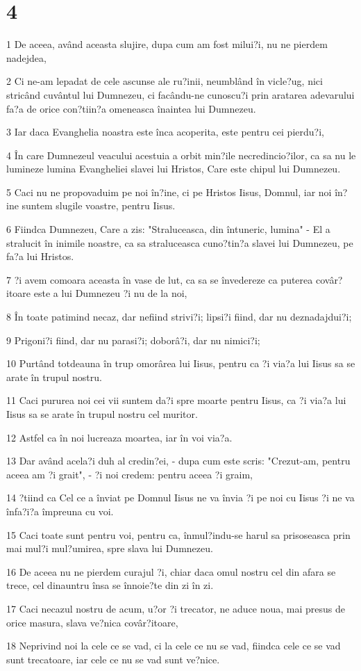 \chapter{4}

\par 1 De aceea, având aceasta slujire, dupa cum am fost milui?i, nu ne pierdem nadejdea,
\par 2 Ci ne-am lepadat de cele ascunse ale ru?inii, neumblând în vicle?ug, nici stricând cuvântul lui Dumnezeu, ci facându-ne cunoscu?i prin aratarea adevarului fa?a de orice con?tiin?a omeneasca înaintea lui Dumnezeu.
\par 3 Iar daca Evanghelia noastra este înca acoperita, este pentru cei pierdu?i,
\par 4 În care Dumnezeul veacului acestuia a orbit min?ile necredincio?ilor, ca sa nu le lumineze lumina Evangheliei slavei lui Hristos, Care este chipul lui Dumnezeu.
\par 5 Caci nu ne propovaduim pe noi în?ine, ci pe Hristos Iisus, Domnul, iar noi în?ine suntem slugile voastre, pentru Iisus.
\par 6 Fiindca Dumnezeu, Care a zis: "Straluceasca, din întuneric, lumina" - El a stralucit în inimile noastre, ca sa straluceasca cuno?tin?a slavei lui Dumnezeu, pe fa?a lui Hristos.
\par 7 ?i avem comoara aceasta în vase de lut, ca sa se învedereze ca puterea covâr?itoare este a lui Dumnezeu ?i nu de la noi,
\par 8 În toate patimind necaz, dar nefiind strivi?i; lipsi?i fiind, dar nu deznadajdui?i;
\par 9 Prigoni?i fiind, dar nu parasi?i; doborâ?i, dar nu nimici?i;
\par 10 Purtând totdeauna în trup omorârea lui Iisus, pentru ca ?i via?a lui Iisus sa se arate în trupul nostru.
\par 11 Caci pururea noi cei vii suntem da?i spre moarte pentru Iisus, ca ?i via?a lui Iisus sa se arate în trupul nostru cel muritor.
\par 12 Astfel ca în noi lucreaza moartea, iar în voi via?a.
\par 13 Dar având acela?i duh al credin?ei, - dupa cum este scris: "Crezut-am, pentru aceea am ?i grait", - ?i noi credem: pentru aceea ?i graim,
\par 14 ?tiind ca Cel ce a înviat pe Domnul Iisus ne va învia ?i pe noi cu Iisus ?i ne va înfa?i?a împreuna cu voi.
\par 15 Caci toate sunt pentru voi, pentru ca, înmul?indu-se harul sa prisoseasca prin mai mul?i mul?umirea, spre slava lui Dumnezeu.
\par 16 De aceea nu ne pierdem curajul ?i, chiar daca omul nostru cel din afara se trece, cel dinauntru însa se înnoie?te din zi în zi.
\par 17 Caci necazul nostru de acum, u?or ?i trecator, ne aduce noua, mai presus de orice masura, slava ve?nica covâr?itoare,
\par 18 Neprivind noi la cele ce se vad, ci la cele ce nu se vad, fiindca cele ce se vad sunt trecatoare, iar cele ce nu se vad sunt ve?nice.

